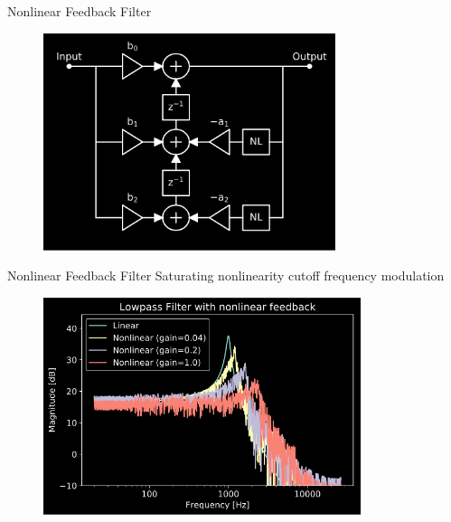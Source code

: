 \begin{frame}{Nonlinear Feedback Filter}
    \begin{figure}
        \includegraphics[height=2.5in]{../NonlinearFeedback/Pics/NL2-TDF-II.png}
    \end{figure}
\end{frame}

\begin{frame}{Nonlinear Feedback Filter}
    Saturating nonlinearity \rightarrow cutoff frequency modulation
    \begin{figure}
        \includegraphics[height=2.5in]{../NonlinearFeedback/Pics/LPF-NL-Dark.png}
    \end{figure}
\end{frame}

